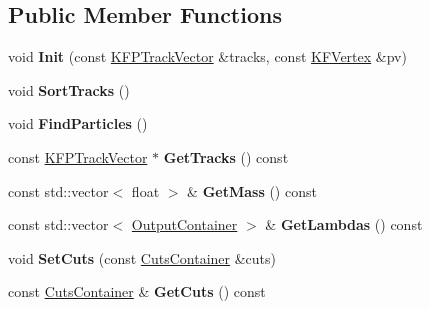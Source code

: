 \subsection*{Public Member Functions}
\begin{DoxyCompactItemize}
\item 
void {\bfseries Init} (const \hyperlink{classKFPTrackVector}{K\+F\+P\+Track\+Vector} \&tracks, const \hyperlink{classKFVertex}{K\+F\+Vertex} \&pv)\hypertarget{classSimpleFinder_ab882be29eaf3e80f7f754b3a8682dc31}{}\label{classSimpleFinder_ab882be29eaf3e80f7f754b3a8682dc31}

\item 
void {\bfseries Sort\+Tracks} ()\hypertarget{classSimpleFinder_aae81d5b2382f10072b91307af30ba4a2}{}\label{classSimpleFinder_aae81d5b2382f10072b91307af30ba4a2}

\item 
void {\bfseries Find\+Particles} ()\hypertarget{classSimpleFinder_a319d1c4da78badd59a538b9839bb2632}{}\label{classSimpleFinder_a319d1c4da78badd59a538b9839bb2632}

\item 
const \hyperlink{classKFPTrackVector}{K\+F\+P\+Track\+Vector} $\ast$ {\bfseries Get\+Tracks} () const \hypertarget{classSimpleFinder_aa1974407925dcb83efad1c68f40fe888}{}\label{classSimpleFinder_aa1974407925dcb83efad1c68f40fe888}

\item 
const std\+::vector$<$ float $>$ \& {\bfseries Get\+Mass} () const \hypertarget{classSimpleFinder_a381a4edacf6f8196a7298846f2f6f0ce}{}\label{classSimpleFinder_a381a4edacf6f8196a7298846f2f6f0ce}

\item 
const std\+::vector$<$ \hyperlink{classOutputContainer}{Output\+Container} $>$ \& {\bfseries Get\+Lambdas} () const \hypertarget{classSimpleFinder_afad8fd09c999b7aea6097fb0797c860b}{}\label{classSimpleFinder_afad8fd09c999b7aea6097fb0797c860b}

\item 
void {\bfseries Set\+Cuts} (const \hyperlink{classCutsContainer}{Cuts\+Container} \&cuts)\hypertarget{classSimpleFinder_a48534300d76d38ae2aa9f1f70dc92d4e}{}\label{classSimpleFinder_a48534300d76d38ae2aa9f1f70dc92d4e}

\item 
const \hyperlink{classCutsContainer}{Cuts\+Container} \& {\bfseries Get\+Cuts} () const \hypertarget{classSimpleFinder_aaedbd2a273aabbe3a45e00613a7d87d8}{}\label{classSimpleFinder_aaedbd2a273aabbe3a45e00613a7d87d8}

\end{DoxyCompactItemize}
